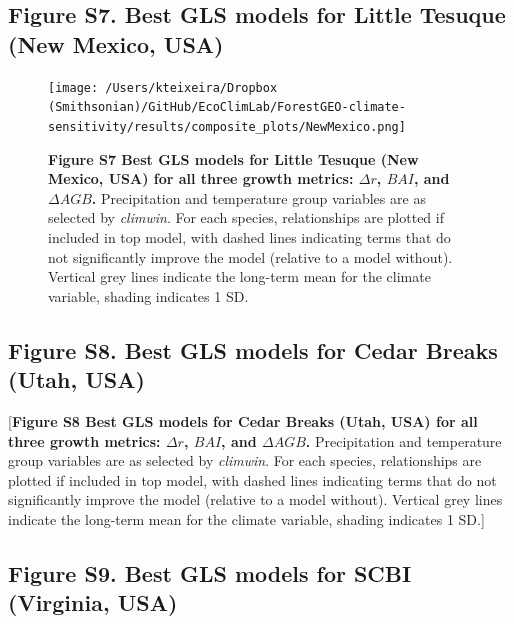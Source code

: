 \documentclass[
]{article}
\begin{document}
\hypertarget{figure-s7.-best-gls-models-for-little-tesuque-new-mexico-usa}{%
\subsection{Figure S7. Best GLS models for Little Tesuque (New Mexico,
USA)}\label{figure-s7.-best-gls-models-for-little-tesuque-new-mexico-usa}}

\begin{figure}
\centering
\texttt{[image: /Users/kteixeira/Dropbox (Smithsonian)/GitHub/EcoClimLab/ForestGEO-climate-sensitivity/results/composite\_plots/NewMexico.png]}
\caption{\textbf{Figure S7 \textbar{} Best GLS models for Little Tesuque
(New Mexico, USA) for all three growth metrics: \(\Delta r\), \(BAI\),
and \(\Delta AGB\).} Precipitation and temperature group variables are
as selected by \emph{climwin}. For each species, relationships are
plotted if included in top model, with dashed lines indicating terms
that do not significantly improve the model (relative to a model
without). Vertical grey lines indicate the long-term mean for the
climate variable, shading indicates 1 SD.}
\end{figure}

\newpage

\hypertarget{figure-s8.-best-gls-models-for-cedar-breaks-utah-usa}{%
\subsection{Figure S8. Best GLS models for Cedar Breaks (Utah,
USA)}\label{figure-s8.-best-gls-models-for-cedar-breaks-utah-usa}}

{[}\textbf{Figure S8 \textbar{} Best GLS models for Cedar Breaks (Utah,
USA) for all three growth metrics: \(\Delta r\), \(BAI\), and
\(\Delta AGB\).} Precipitation and temperature group variables are as
selected by \emph{climwin}. For each species, relationships are plotted
if included in top model, with dashed lines indicating terms that do not
significantly improve the model (relative to a model without). Vertical
grey lines indicate the long-term mean for the climate variable, shading
indicates 1 SD.{]}

\newpage

\hypertarget{figure-s9.-best-gls-models-for-scbi-virginia-usa}{%
\subsection{Figure S9. Best GLS models for SCBI (Virginia,
USA)}\label{figure-s9.-best-gls-models-for-scbi-virginia-usa}}
\end{document}
